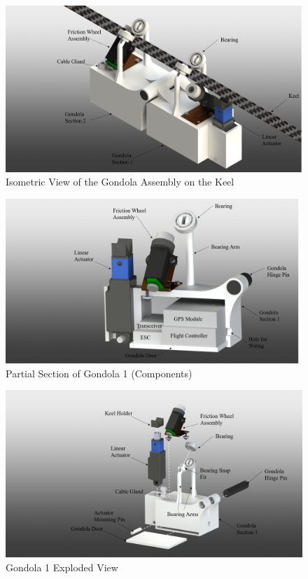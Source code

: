 \documentclass[../main.tex]{subfiles}
\begin{document}
\begin{figure}[H]
	\centering
	\includegraphics[width=.8\linewidth]{img/design/gondola/gondolaIsometric.png}
	\caption{Isometric View of the Gondola Assembly on the Keel}
	\label{fig:gondolaIsomeric}
\end{figure}

\begin{figure}[H]
	\centering
	\includegraphics[width=.8\linewidth]{img/design/gondola/gondolaPartialSection.png}
	\caption{Partial Section of Gondola 1 (Components)}
	\label{fig:gondolaPartialSection}
\end{figure}

\begin{figure}[H]
	\centering
	\includegraphics[width=.8\linewidth]{img/design/gondola/gondola1ExplodedView.png}
	\caption{Gondola 1 Exploded View}
	\label{fig:gondola1ExplodedView}
\end{figure}
\end{document}
